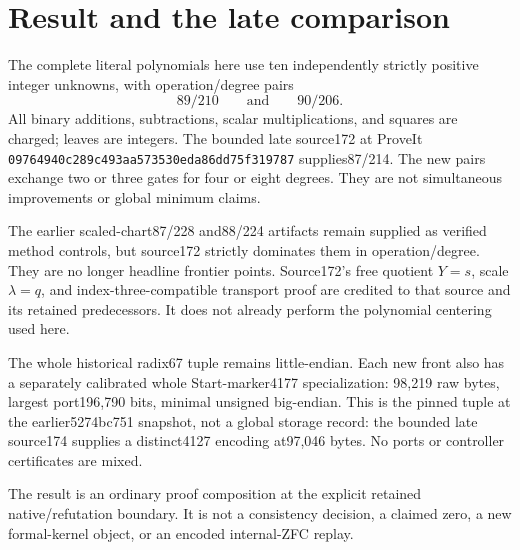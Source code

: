\section{Result and the late comparison}
The complete literal polynomials here use ten independently strictly positive
integer unknowns, with operation/degree pairs
\[
 \boxed{89/210\qquad\text{and}\qquad90/206.}
\]
All binary additions, subtractions, scalar multiplications, and squares are
charged; leaves are integers. The bounded late source172 at ProveIt
\texttt{09764940c289c493aa573530eda86dd75f319787} supplies87/214.
The new pairs exchange two or three gates for four or eight degrees.
They are not simultaneous improvements or global minimum claims.

The earlier scaled-chart87/228 and88/224 artifacts remain supplied as
verified method controls, but source172 strictly dominates them in
operation/degree. They are no longer headline frontier points. Source172's
free quotient $Y=s$, scale $\lambda=q$, and index-three-compatible
transport proof are credited to that source and its retained predecessors.
It does not already perform the polynomial centering used here.

The whole historical radix67 tuple remains little-endian. Each new front
also has a separately calibrated whole Start-marker4177 specialization:
98,219 raw bytes, largest port196,790 bits, minimal unsigned big-endian.
This is the pinned tuple at the earlier5274bc751 snapshot, not a
global storage record: the bounded late source174 supplies a distinct4127
encoding at97,046 bytes. No ports or controller certificates are mixed.

The result is an ordinary proof composition at the explicit retained
native/refutation boundary. It is not a consistency decision, a claimed
zero, a new formal-kernel object, or an encoded internal-ZFC replay.

